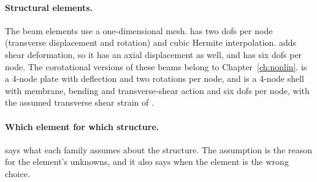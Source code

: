 \begin{table}[ht]
\centering\small

\caption{Elements of this chapter.  is the attribute of the class as it stands in tag \booktag; its meaning is the number of points per direction for quadrilaterals and hexahedra, and a simplex rule order for triangles and tetrahedra.}\label{tab:el-elements}
\end{table}

\paragraph{Structural elements.}
The beam elements use a one-dimensional mesh.  has two dofs per node (transverse displacement and rotation) and cubic Hermite interpolation.  adds shear deformation, so it has an axial displacement as well, and  has six dofs per node. The corotational versions of these beams belong to Chapter~\ref{ch:nonlin}.  is a 4-node plate with deflection and two rotations per node, and  is a 4-node shell with membrane, bending and transverse-shear action and six dofs per node, with the assumed transverse shear strain of \citet{dvorkin1984}.

\paragraph{Which element for which structure.}  says what each family assumes about the structure. The assumption is the reason for the element's unknowns, and it also says when the element is the wrong choice.

